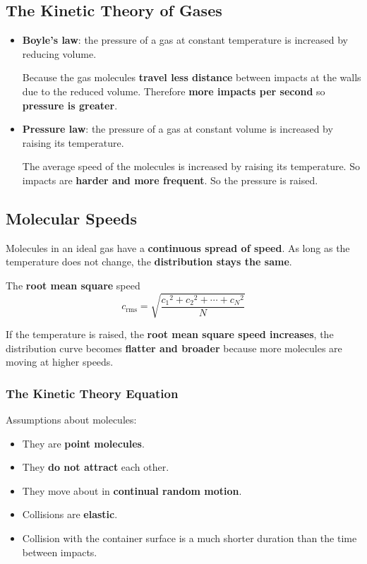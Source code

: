 \subsection{The Kinetic Theory of Gases}

\begin{itemize}
    \item \textbf{Boyle's law}: the pressure of a gas at constant temperature is increased by reducing volume.

        Because the gas molecules \textbf{travel less distance} between impacts at the walls due to the reduced volume. Therefore \textbf{more impacts per second} so \textbf{pressure is greater}.
    \item \textbf{Pressure law}: the pressure of a gas at constant volume is increased by raising its temperature.

        The average speed of the molecules is increased by raising its temperature. So impacts are \textbf{harder and more frequent}. So the pressure is raised.
\end{itemize}

\subsection*{Molecular Speeds}

Molecules in an ideal gas have a \textbf{continuous spread of speed}. As long as the temperature does not change, the \textbf{distribution stays the same}.

The \textbf{root mean square} speed
$$c_\text{rms}=\sqrt{\frac{{c_1}^2+{c_2}^2+\cdots+{c_N}^2}{N}}$$

If the temperature is raised, the \textbf{root mean square speed increases}, the distribution curve becomes \textbf{flatter and broader} because more molecules are moving at higher speeds.

\subsubsection*{The Kinetic Theory Equation}

Assumptions about molecules:
\begin{itemize}
    \item They are \textbf{point molecules}.
    \item They \textbf{do not attract} each other.
    \item They move about in \textbf{continual random motion}.
    \item Collisions are \textbf{elastic}.
    \item Collision with the container surface is a much shorter duration than the time between impacts.
\end{itemize}

